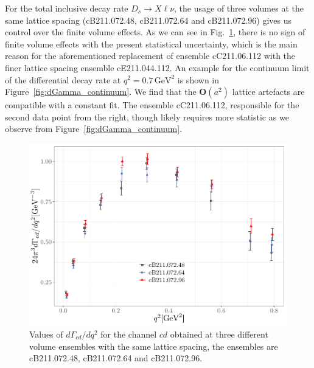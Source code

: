 \documentclass [a4paper, 11pt]{article}
\begin{document}
For the total inclusive decay rate $D_s \to X\ell\nu$, the usage of three volumes
at the same lattice spacing (cB211.072.48, cB211.072.64 and cB211.072.96)
gives us control over the finite volume effects. As we can see in Fig.~\ref{fig:dGamma_FSE_B},
there is no sign of finite volume effects with the present statistical
uncertainty, which is the main reason for the aforementioned
replacement of ensemble cC211.06.112 with the finer lattice spacing
ensemble cE211.044.112.
An example for the continuum limit of the differential decay rate at
$q^2=0.7\,\mathrm{GeV}^2$ is shown in Figure~\ref{fig:dGamma_continuum}. We find that the
$\mathbf{O}(a^2)$ lattice artefacts are compatible with a constant
fit. The ensemble cC211.06.112, responsible for the second data point
from the right, though likely requires more statistic as we observe from Figure~\ref{fig:dGamma_continuum}.

\begin{figure}
	\begin{center}
		\includegraphics[scale=0.7]{figures/dGamma_FSE_B.pdf}
		\caption{Values of $d\Gamma_{cd}/dq^2 $ for the channel $cd$ obtained at three different volume
			ensembles with the same lattice spacing, the ensembles are cB211.072.48, cB211.072.64 and cB211.072.96.}
		\label{fig:dGamma_FSE_B}
	\end{center}
\end{figure}
\end{document}
